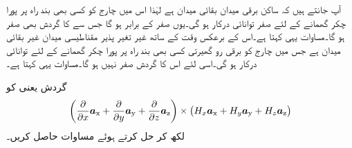 آپ جانتے ہیں کہ ساکن برقی میدان  بقائی میدان ہے لہٰذا اس میں چارج  کو کسی بھی بند راہ پر پورا چکر گھمانے کے لئے صفر توانائی درکار ہو گی۔یوں  صفر کے برابر ہو گا جس سے  کا گردش بھی صفر ہو گا۔مساوات  یہی کہتا ہے۔اس کے برعکس وقت کے ساتھ غیر تغیر پذیر مقناطیسی میدان غیر بقائی میدان ہے جس میں چارج کو برقی رو گھیرتی کسی بھی بند راہ پر پورا چکر گھمانے کے لئے توانائی درکار ہو گی۔اسی لئے اس کا گردش صفر نہیں ہو گا۔مساوات  یہی کہتا ہے۔


گردش یعنی  کو
\begin{align*}
\left(\frac{\partial }{\partial x}{\boldsymbol{a}}_{\textup{x}}+\frac{\partial }{\partial y}{\boldsymbol{a}}_{\textup{y}}+\frac{\partial }{\partial z}{\boldsymbol{a}}_{\textup{z}} \right) \times \left(H_x {\boldsymbol{a}}_{\textup{x}}+H_y {\boldsymbol{a}}_{\textup{y}}+H_z {\boldsymbol{a}}_{\textup{z}} \right)
\end{align*}
لکھ کر حل کرتے ہوئے مساوات  حاصل کریں۔

